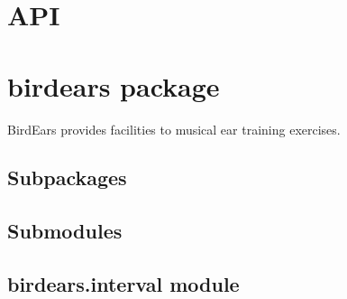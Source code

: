 \documentclass[letterpaper,10pt,english]{sphinxmanual}
\begin{document}
\chapter{API}
\label{\detokenize{index:api}}

\chapter{birdears package}
\label{\detokenize{index:birdears-package}}\label{\detokenize{index:module-birdears}}
BirdEars provides facilities to musical ear training exercises.


\section{Subpackages}
\label{\detokenize{index:subpackages}}

\section{Submodules}
\label{\detokenize{index:submodules}}

\section{birdears.interval module}
\label{\detokenize{index:module-birdears.interval}}\label{\detokenize{index:birdears-interval-module}}
\end{document}
